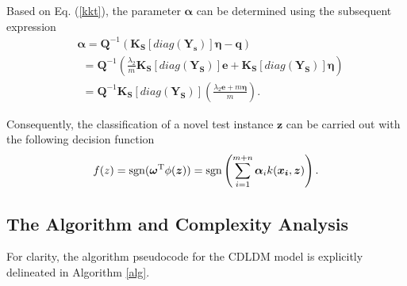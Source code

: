 \documentclass[a4paper]{cas-sc}
\newtheorem{myTheo}{Theorem}
\begin{document}


Based on Eq. (\ref{kkt}), the parameter $\boldsymbol{\alpha}$ can be determined using the subsequent expression
\begin{equation}\label{alpha}
\begin{aligned}
&\boldsymbol{\alpha}  = {\boldsymbol{Q}^{ - 1}}\left( {\boldsymbol{K_S}[diag(\boldsymbol{Y_s})]\boldsymbol{\eta} - \boldsymbol{q}} \right)\\
& \ \ = {\boldsymbol{Q}^{ - 1}}\left (\frac{{{\lambda _2}}}{m}\boldsymbol{K_S}[diag(\boldsymbol{Y_S})]\boldsymbol{e} + \boldsymbol{K_S}[diag(\boldsymbol{Y_S})]\boldsymbol{\eta}  \right)\\
& \ \ = {\boldsymbol{Q}^{ - 1}}\boldsymbol{K_S}[diag(\boldsymbol{Y_S})](\frac{{{\lambda _2}\boldsymbol{e} + m\boldsymbol{\eta} }}{m}).
\end{aligned}
\end{equation}

Consequently, the classification of a novel test instance $\boldsymbol{z}$ can be carried out with the following decision function
\begin{equation}\label{KERNEL}
f({{z}}) = {\mathop{\rm sgn}} ({\boldsymbol{\omega} ^{\mathrm{T}}}\phi (\boldsymbol{z})) = {\mathop{\rm sgn}}\left(\sum\limits_{i = 1}^{m+n} {{\boldsymbol{\alpha} _i}k({\boldsymbol{x_i}},\boldsymbol{z})} \right).
\end{equation} 



\subsection{The Algorithm and Complexity Analysis}\label{time}
For clarity, the algorithm pseudocode for the CDLDM model is explicitly delineated in Algorithm \ref{alg}.
\end{document}
